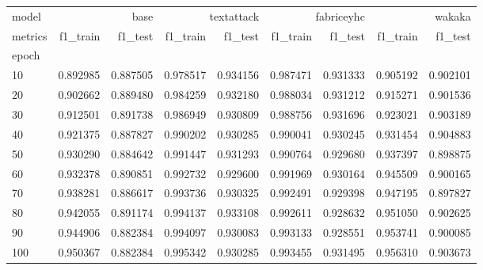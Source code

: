 \begin{tabular}{lrrrrrrrr}
model & \multicolumn{2}{r}{base} & \multicolumn{2}{r}{textattack} & \multicolumn{2}{r}{fabriceyhc} & \multicolumn{2}{r}{wakaka} \\
metrics & f1_train & f1_test & f1_train & f1_test & f1_train & f1_test & f1_train & f1_test \\
epoch &  &  &  &  &  &  &  &  \\
10 & 0.892985 & 0.887505 & 0.978517 & 0.934156 & 0.987471 & 0.931333 & 0.905192 & 0.902101 \\
20 & 0.902662 & 0.889480 & 0.984259 & 0.932180 & 0.988034 & 0.931212 & 0.915271 & 0.901536 \\
30 & 0.912501 & 0.891738 & 0.986949 & 0.930809 & 0.988756 & 0.931696 & 0.923021 & 0.903189 \\
40 & 0.921375 & 0.887827 & 0.990202 & 0.930285 & 0.990041 & 0.930245 & 0.931454 & 0.904883 \\
50 & 0.930290 & 0.884642 & 0.991447 & 0.931293 & 0.990764 & 0.929680 & 0.937397 & 0.898875 \\
60 & 0.932378 & 0.890851 & 0.992732 & 0.929600 & 0.991969 & 0.930164 & 0.945509 & 0.900165 \\
70 & 0.938281 & 0.886617 & 0.993736 & 0.930325 & 0.992491 & 0.929398 & 0.947195 & 0.897827 \\
80 & 0.942055 & 0.891174 & 0.994137 & 0.933108 & 0.992611 & 0.928632 & 0.951050 & 0.902625 \\
90 & 0.944906 & 0.882384 & 0.994097 & 0.930083 & 0.993133 & 0.928551 & 0.953741 & 0.900085 \\
100 & 0.950367 & 0.882384 & 0.995342 & 0.930285 & 0.993455 & 0.931495 & 0.956310 & 0.903673 \\
\end{tabular}
